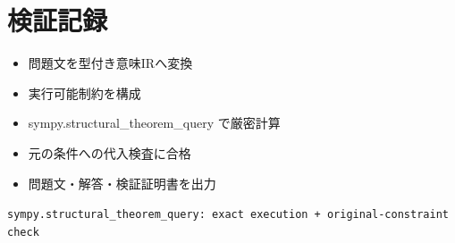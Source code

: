 \documentclass[uplatex,dvipdfmx,11pt]{jsarticle}
\begin{document}
\section*{検証記録}
\begin{itemize}
\item 問題文を型付き意味IRへ変換
\item 実行可能制約を構成
\item sympy.structural\_theorem\_query で厳密計算
\item 元の条件への代入検査に合格
\item 問題文・解答・検証証明書を出力
\end{itemize}
\noindent\texttt{sympy.structural\_theorem\_query: exact execution + original-constraint check}
\par{}
\end{document}
